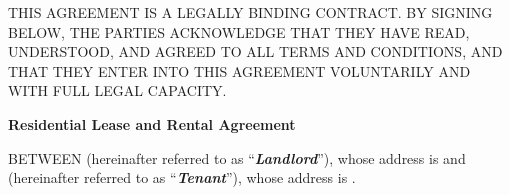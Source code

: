
\begin{sloppypar}
THIS AGREEMENT IS A LEGALLY BINDING CONTRACT. BY SIGNING BELOW, THE PARTIES ACKNOWLEDGE THAT THEY HAVE READ, UNDERSTOOD, AND AGREED TO ALL TERMS AND CONDITIONS, AND THAT THEY ENTER INTO THIS AGREEMENT VOLUNTARILY AND WITH FULL LEGAL CAPACITY.
\end{sloppypar}

\begin{center}

\textbf{Residential Lease and Rental Agreement}

\end{center}

\begin{sloppypar}
BETWEEN \LandlordName{} (hereinafter referred to as “\textbf{\textit{Landlord}}”), whose address is \LandlordAddress{} and \TenantName{} (hereinafter referred to as  “\textbf{\textit{Tenant}}”), whose address is \TenantAddress{}.
\end{sloppypar}

